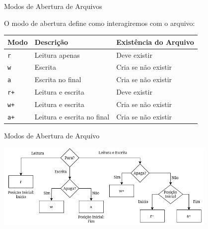 \begin{frame}{Modos de Abertura de Arquivos}
    \begin{block}{}
        O modo de abertura define como interagiremos com o arquivo:
    \end{block}

    \centering
    \begin{tabular}{|l|l|l|}
        \hline
        \textbf{Modo} & \textbf{Descrição} & \textbf{Existência do Arquivo} \\
        \hline
        \texttt{r} & Leitura apenas & Deve existir \\
        \hline
        \texttt{w} & Escrita & Cria se não existir \\
        \hline
        \texttt{a} & Escrita no final & Cria se não existir \\
        \hline
        \texttt{r+} & Leitura e escrita & Deve existir \\
        \hline
        \texttt{w+} & Leitura e escrita  & Cria se não existir \\
        \hline
        \texttt{a+} & Leitura e escrita no final & Cria se não existir \\
        \hline
    \end{tabular}
    
\end{frame}


\begin{frame}{Modos de Abertura de Arquivo}

\centering
\includegraphics[width=0.8\textwidth]{Images/diagrama-modos-leitura.png}


\end{frame}


